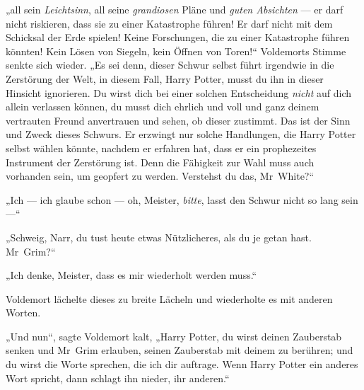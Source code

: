 „all sein \emph{Leichtsinn}, all seine \emph{grandiosen} Pläne und \emph{guten Absichten} — er darf nicht riskieren, dass sie zu einer Katastrophe führen! Er darf nicht mit dem Schicksal der Erde spielen! Keine Forschungen, die zu einer Katastrophe führen könnten! Kein Lösen von Siegeln, kein Öffnen von Toren!“
Voldemorts Stimme senkte sich wieder.
„Es sei denn, dieser Schwur selbst führt irgendwie in die Zerstörung der Welt, in diesem Fall, Harry Potter, musst du ihn in dieser Hinsicht ignorieren. Du wirst dich bei einer solchen Entscheidung \emph{nicht} auf dich allein verlassen können, du musst dich ehrlich und voll und ganz deinem vertrauten Freund anvertrauen und sehen, ob dieser zustimmt. Das ist der Sinn und Zweck dieses Schwurs. Er erzwingt nur solche Handlungen, die Harry Potter selbst wählen könnte, nachdem er erfahren hat, dass er ein prophezeites Instrument der Zerstörung ist. Denn die Fähigkeit zur Wahl muss auch vorhanden sein, um geopfert zu werden. Verstehst du das, Mr~White?“

„Ich — ich glaube schon — oh, Meister, \emph{bitte}, lasst den Schwur nicht so lang sein —“

„Schweig, Narr, du tust heute etwas Nützlicheres, als du je getan hast. Mr~Grim?“

„Ich denke, Meister, dass es mir wiederholt werden muss.“

Voldemort lächelte dieses zu breite Lächeln und wiederholte es mit anderen Worten.

„Und nun“, sagte Voldemort kalt,
„Harry Potter, du wirst deinen Zauberstab senken und Mr~Grim erlauben, seinen Zauberstab mit deinem zu berühren; und du wirst die Worte sprechen, die ich dir auftrage. Wenn Harry Potter ein anderes Wort spricht, dann schlagt ihn nieder, ihr anderen.“

